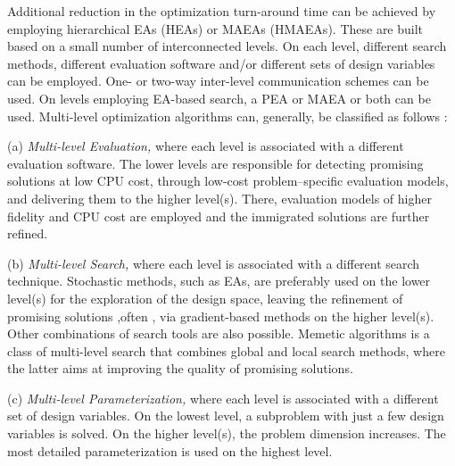 Additional reduction in the optimization turn-around time can be achieved by employing hierarchical EAs (HEAs) or MAEAs (HMAEAs)\cite{phd_Karakasis,phd_Kampolis,Herr1999,LTT_2_044, LTT_2_031,Lim2007}. These are built based on a small number of interconnected levels. On each level, different search methods, different evaluation software and/or different sets of design variables can be employed. One- or two-way inter-level communication schemes can be used. On levels employing EA-based search, a PEA or MAEA or both can be used. Multi-level optimization algorithms can, generally, be classified as follows \cite{ParCFD}:

(a) \emph{Multi-level Evaluation,} where each level is associated with
a different evaluation software. The lower levels are responsible
for detecting promising solutions  at low CPU cost, through low-cost problem--specific evaluation models, and
delivering them to the higher level(s). There, evaluation models of
higher fidelity and CPU cost are employed and the immigrated
solutions are further refined. 

(b) \emph{Multi-level Search,} where each level is associated with a
different search technique. Stochastic methods, such as EAs, are
preferably used on the lower level(s) for the exploration of the
design space, leaving the refinement of promising solutions ,often , via gradient-based methods on the higher level(s). Other
combinations of search tools are also possible. Memetic algorithms \cite{Krans2005,Ong2004,Ong2006,LTT_2_043,LTT_2_053,LTT_4_04} is a class of multi-level search that combines global and local search methods, where the latter aims at improving the quality of
promising solutions.


(c) \emph{Multi-level Parameterization,} where each level is
associated with a different set of design variables. On the lowest
level, a subproblem with just a few design variables is solved. On
the higher level(s), the problem dimension increases. The most detailed parameterization is used on the highest level.



